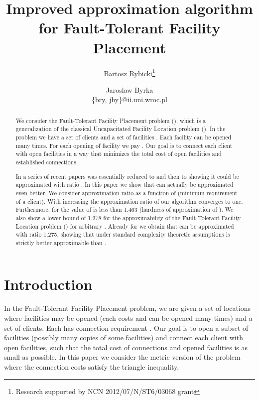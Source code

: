 \documentclass{llncs}
\begin{document}
\title{Improved approximation algorithm for Fault-Tolerant Facility Placement}

\author{Bartosz Rybicki\thanks{Research supported by NCN 2012/07/N/ST6/03068 grant} \and Jaroslaw Byrka\\ \{bry, jby\}@ii.uni.wroc.pl}


\maketitle

\begin{abstract}
We consider the Fault-Tolerant Facility Placement problem (), which is a generalization of the classical Uncapacitated Facility Location problem (). In the  problem we have a set of clients  and a set of facilities . Each facility  can be opened many times. For each opening of facility  we pay . Our goal is to connect each client  with  open facilities in a way that minimizes the total cost of open facilities and established connections. 

In a series of recent papers  was essentially reduced to  and then to  showing it could be approximated with ratio . In this paper we show that  can actually be approximated even better. We consider approximation ratio as a function of  (minimum requirement of a client). With increasing  the approximation ratio of our algorithm  converges to one. Furthermore, for  the value of  is less than 1.463 (hardness of approximation of ). We also show a lower bound of 1.278 for the approximability of the Fault-Tolerant Facility Location problem () for arbitrary . Already for  we obtain that  can be approximated with ratio 1.275, showing that under standard complexity theoretic assumptions  is strictly better approximable than . 
\end{abstract}

\newpage

\section{Introduction}
In the Fault-Tolerant Facility Placement problem, we are given a set  of locations where facilities may be opened (each  costs  and can be opened many times) and a set  of clients. Each  has connection requirement . Our goal is to open a subset of facilities (possibly many copies of some facilities) and connect each client  with  open facilities, such that the total cost of connections and opened facilities is as small as possible. In this paper we consider the metric version of the problem where the connection costs satisfy the triangle inequality.
\end{document}
